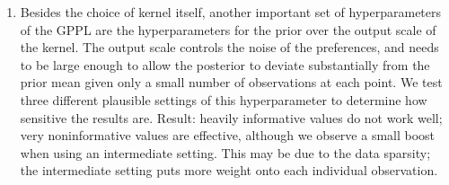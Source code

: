 \begin{enumerate}
  \item Besides the choice of kernel itself, another important set of hyperparameters of the GPPL are the hyperparameters for the prior over the output scale of the kernel. The output scale controls the noise of the preferences, and needs to be large enough to allow the posterior to deviate substantially from the prior mean given only a small number of observations at each point. We test three different plausible settings of this hyperparameter to determine how sensitive the results are. Result: heavily informative values do not work well; very noninformative values are effective, although we observe a small boost when using an intermediate setting. This may be due to the data sparsity; the intermediate setting puts more weight onto each individual observation.
  
\end{enumerate}

